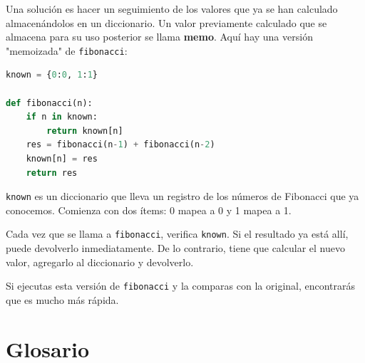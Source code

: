 Una solución es hacer un seguimiento de los valores que ya se han calculado almacenándolos en un diccionario. Un valor previamente calculado que se almacena para su uso posterior se llama \textbf{memo}. Aquí hay una versión "memoizada" de \texttt{fibonacci}:

\begin{lstlisting}[language=Python]
known = {0:0, 1:1}

def fibonacci(n):
    if n in known:
        return known[n]
    res = fibonacci(n-1) + fibonacci(n-2)
    known[n] = res
    return res
\end{lstlisting}

\texttt{known} es un diccionario que lleva un registro de los números de Fibonacci que ya conocemos. Comienza con dos ítems: 0 mapea a 0 y 1 mapea a 1.

Cada vez que se llama a \texttt{fibonacci}, verifica \texttt{known}. Si el resultado ya está allí, puede devolverlo inmediatamente. De lo contrario, tiene que calcular el nuevo valor, agregarlo al diccionario y devolverlo.

Si ejecutas esta versión de \texttt{fibonacci} y la comparas con la original, encontrarás que es mucho más rápida.

\section{Glosario}

